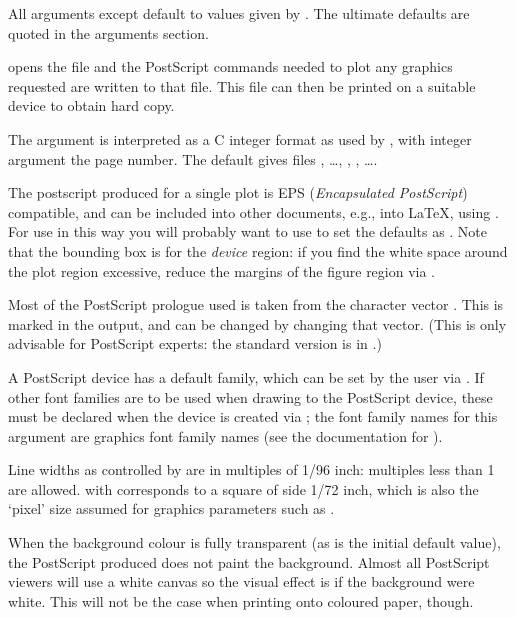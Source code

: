 \begin{Details}\relax
All arguments except  default to values given by
.  The ultimate defaults are quoted in the
arguments section.

 opens the file  and the PostScript
commands needed to plot any graphics requested are written to that
file.  This file can then be printed on a suitable device to obtain
hard copy.

The  argument is interpreted as a C integer format as used
by , with integer argument the page number.
The default gives files , \dots, ,
, \dots.

The postscript produced for a single \R{} plot is EPS (\emph{Encapsulated
PostScript}) compatible, and can be included into other documents,
e.g., into LaTeX, using .  For use
in this way you will probably want to use  to
set the defaults as .  Note that the bounding box is for the \emph{device}
region: if you find the white space around the plot region excessive,
reduce the margins of the figure region via .

Most of the PostScript prologue used is taken from the \R{} character
vector .  This is marked in the output, and can be
changed by changing that vector.  (This is only advisable for
PostScript experts: the standard version is in
.)

A PostScript device has a default family, which can be set by the user
via .  If other font families are to be used when drawing
to the PostScript device, these must be declared when the device is
created via ;  the font family names for this argument are
\R{} graphics font family names (see the documentation for
).

Line widths as controlled by  are in multiples of
1/96 inch: multiples less than 1 are allowed.   with
 corresponds to a square of side 1/72 inch, which is
also the `pixel' size assumed for graphics parameters such as
.

When the background colour is fully transparent (as is the initial
default value), the PostScript produced does not paint the
background. Almost all PostScript viewers will use a white canvas so
the visual effect is if the background were white.  This will not be
the case when printing onto coloured paper, though.
\end{Details}
